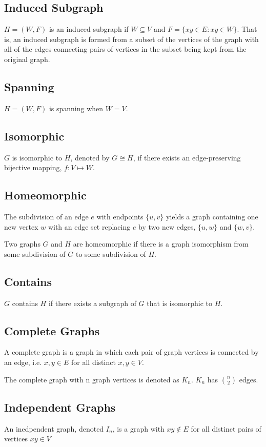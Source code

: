 \documentclass{article}
\begin{document}
\subsection{Induced Subgraph}
$H = (W, F)$ is an induced subgraph if $W \subseteq V$ and $F = \{ xy \in E : xy \in W \}$. That is,  an induced subgraph is formed from a subset of the vertices of the graph with all of the edges connecting pairs of vertices in the subset being kept from the original graph.

\subsection{Spanning}
$H = (W, F)$ is spanning when $W = V$.

\subsection{Isomorphic}
$G$ is isomorphic to $H$, denoted by $G \cong H$, if there exists an edge-preserving bijective mapping, $f: V \mapsto W$.

\subsection{Homeomorphic}
The subdivision of an edge $e$ with endpoints $\{u,v\}$ yields a graph containing one new vertex $w$ with an edge set replacing $e$ by two new edges, $\{u,w\}$ and $\{w,v\}$.

Two graphs $G$ and $H$ are homeomorphic if there is a graph isomorphism from some subdivision of $G$ to some subdivision of $H$.

\subsection{Contains}
$G$ contains $H$ if there exists a subgraph of $G$ that is isomorphic to $H$. 

\subsection{Complete Graphs}
A complete graph is a graph in which each pair of graph vertices is connected by an edge, i.e. $x, y \in E$ for all distinct $x,y \in V$. 

The complete graph with n graph vertices is denoted as $K_n$. $K_n$ has $\binom{n}{2}$ edges.

\subsection{Independent Graphs}
An inedpendent graph, denoted $I_n$, is a graph with $xy \not\in E$ for all distinct pairs of vertices $xy \in V$
\end{document}
